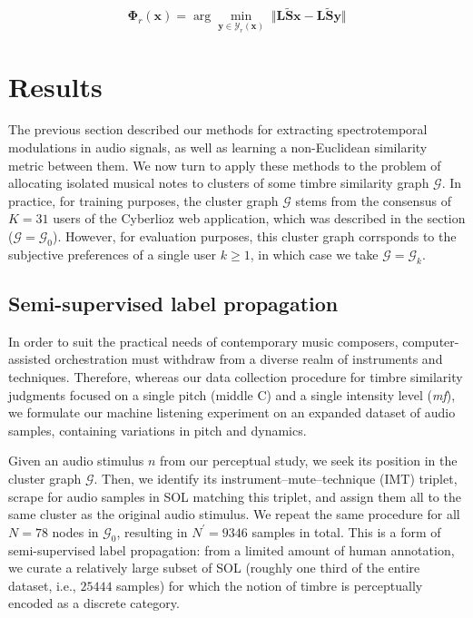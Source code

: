 \documentclass{bmcart}
\newcommand{\lnameref}[1]{%
\bgroup
\let\nmu\MakeLowercase
\nameref{#1}\egroup}
\newcommand{\nmu}{}
\begin{document}
\begin{equation}
\mathbf{\Phi}_r (\boldsymbol{x}) =
\arg \min_{\boldsymbol{y}\in \mathcal{Y}_r(\boldsymbol{x})}
\;
\big\Vert
\mathbf{L}\mathbf{\widetilde{S}}\boldsymbol{x}
-
\mathbf{L}\mathbf{\widetilde{S}}\boldsymbol{y}
\big\Vert
\end{equation}


\section*{\nmu Results}
\label{sec:results}

The previous section described our methods for extracting spectrotemporal modulations in audio signals, as well as learning a non-Euclidean similarity metric between them.
We now turn to apply these methods to the problem of allocating isolated musical notes to clusters of some timbre similarity graph $\mathcal{G}$.
In practice, for training purposes, the cluster graph $\mathcal{G}$ stems from the consensus of $K=31$ users of the Cyberlioz web application, which was described in the \lnameref{sec:survey} section ($\mathcal{G}=\mathcal{G}_0$).
However, for evaluation purposes, this cluster graph corrsponds to the subjective preferences of a single user $k\geq 1$, in which case we take $\mathcal{G}=\mathcal{G}_k$.


\subsection*{Semi-supervised label propagation}

In order to suit the practical needs of contemporary music composers, computer-assisted orchestration must withdraw from a diverse realm of instruments and techniques.
Therefore, whereas our data collection procedure for timbre similarity judgments focused on a single pitch (middle C) and a single intensity level (\emph{mf}), we formulate our machine listening experiment on an expanded dataset of audio samples, containing variations in pitch and dynamics.

Given an audio stimulus $n$ from our perceptual study, we seek its position in the cluster graph $\mathcal{G}$.
Then, we identify its instrument--mute--technique (IMT) triplet, scrape for audio samples in SOL matching this triplet, and assign them all to the same cluster as the original audio stimulus.
We repeat the same procedure for all $N=78$ nodes in $\mathcal{G}_0$, resulting in $N^\prime = 9346$ samples in total.
This is a form of semi-supervised label propagation: from a limited amount of human annotation, we curate a relatively large subset of SOL (roughly one third of the entire dataset, i.e., $25444$ samples) for which the notion of timbre is perceptually encoded as a discrete category.
\end{document}
